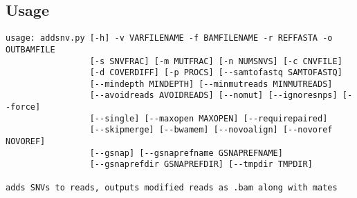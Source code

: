\documentclass[letterpaper,11pt]{article}
\begin{document}
\subsection{Usage}
\begin{verbatim}
usage: addsnv.py [-h] -v VARFILENAME -f BAMFILENAME -r REFFASTA -o OUTBAMFILE
                 [-s SNVFRAC] [-m MUTFRAC] [-n NUMSNVS] [-c CNVFILE]
                 [-d COVERDIFF] [-p PROCS] [--samtofastq SAMTOFASTQ]
                 [--mindepth MINDEPTH] [--minmutreads MINMUTREADS]
                 [--avoidreads AVOIDREADS] [--nomut] [--ignoresnps] [--force]
                 [--single] [--maxopen MAXOPEN] [--requirepaired]
                 [--skipmerge] [--bwamem] [--novoalign] [--novoref NOVOREF]
                 [--gsnap] [--gsnaprefname GSNAPREFNAME]
                 [--gsnaprefdir GSNAPREFDIR] [--tmpdir TMPDIR]

adds SNVs to reads, outputs modified reads as .bam along with mates


\end{verbatim}
\end{document}

